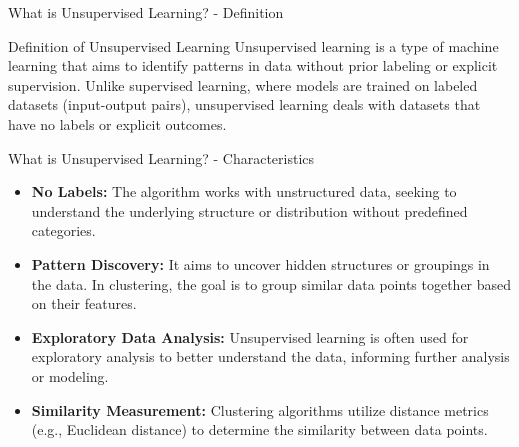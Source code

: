 \documentclass[aspectratio=169]{beamer}
\begin{document}
\begin{frame}[fragile]{What is Unsupervised Learning? - Definition}
    \begin{block}{Definition of Unsupervised Learning}
        Unsupervised learning is a type of machine learning that aims to identify patterns in data without prior labeling or explicit supervision. 
        Unlike supervised learning, where models are trained on labeled datasets (input-output pairs), unsupervised learning deals with datasets that have no labels or explicit outcomes.
    \end{block}
\end{frame}

\begin{frame}[fragile]{What is Unsupervised Learning? - Characteristics}
    \begin{itemize}
        \item \textbf{No Labels:} The algorithm works with unstructured data, seeking to understand the underlying structure or distribution without predefined categories.
        \item \textbf{Pattern Discovery:} It aims to uncover hidden structures or groupings in the data. In clustering, the goal is to group similar data points together based on their features.
        \item \textbf{Exploratory Data Analysis:} Unsupervised learning is often used for exploratory analysis to better understand the data, informing further analysis or modeling.
        \item \textbf{Similarity Measurement:} Clustering algorithms utilize distance metrics (e.g., Euclidean distance) to determine the similarity between data points.
    \end{itemize}
\end{frame}
\end{document}
